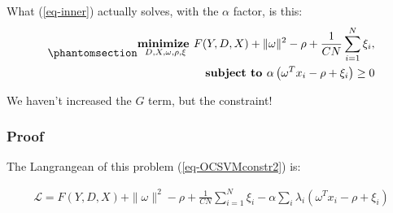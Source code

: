 \documentclass[
  letterpaper,
  DIV=11,
  numbers=noendperiod]{scrartcl}
\begin{document}
What (\ref{eq-inner}) actually solves, with the \(\alpha\) factor, is
this: \begin{equation}\phantomsection\label{eq-OCSVMconstr2}{
\begin{align}
\underset{D, X, \omega, \rho, \xi}{\textbf{minimize  }} F(Y, D, X) + \|\omega\|^2 - \rho + \frac{1}{CN} \sum_{i=1}^{N} \xi_i, \\
\textbf{subject to  } \alpha \left( \omega^T x_i - \rho + \xi_i \right) \geq 0\\
\end{align}
}\end{equation}

We haven't increased the \(G\) term, but the constraint!

\subsubsection{Proof}\label{proof}

The Langrangean of this problem (\ref{eq-OCSVMconstr2}) is:

\[
\begin{align}
\mathcal{L} = F(Y, D, X) + \|\omega\|^2 - \rho + \frac{1}{CN} \sum_{i=1}^{N} \xi_i - \alpha \sum_i \lambda_i \left(\omega^T x_i - \rho + \xi_i \right)
\end{align}
\]
\end{document}
